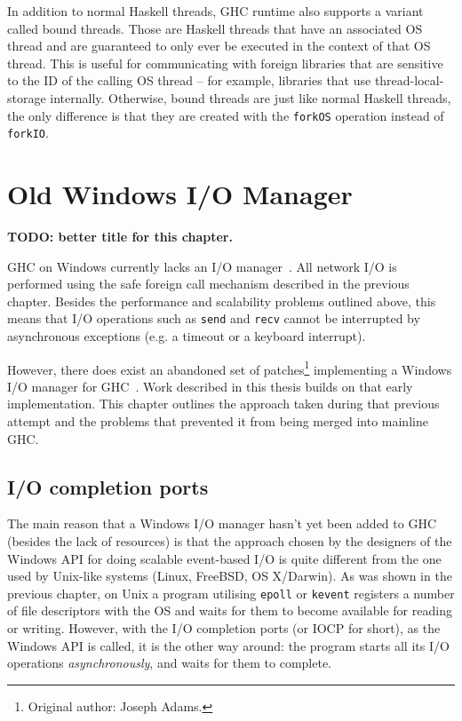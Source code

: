 \documentclass[a4paper,11pt,oneside]{report}
\begin{document}
In addition to normal Haskell threads, GHC runtime also supports a variant
called bound threads. Those are Haskell threads that have an associated OS
thread and are guaranteed to only ever be executed in the context of that OS
thread. This is useful for communicating with foreign libraries that are
sensitive to the ID of the calling OS thread -- for example, libraries that use
thread-local-storage internally. Otherwise, bound threads are just like normal
Haskell threads, the only difference is that they are created with the
\texttt{forkOS} operation instead of \texttt{forkIO}.

\chapter{Old Windows I/O Manager}
\label{chap:old-io-manager}

\textbf{TODO: better title for this chapter.}

GHC on Windows currently lacks an I/O manager~\cite{bib:ticket7353}. All network
I/O is performed using the safe foreign call mechanism described in the previous
chapter. Besides the performance and scalability problems outlined above, this
means that I/O operations such as \texttt{send} and \texttt{recv} cannot be
interrupted by asynchronous exceptions (e.g. a timeout or a keyboard interrupt).

However, there does exist an abandoned set of patches\footnote{Original author:
  Joseph Adams.} implementing a Windows I/O manager for
GHC~\cite{bib:ticket7353}. Work described in this thesis builds on that early
implementation. This chapter outlines the approach taken during that previous
attempt and the problems that prevented it from being merged into mainline GHC.

\section{I/O completion ports}

The main reason that a Windows I/O manager hasn't yet been added to GHC (besides
the lack of resources) is that the approach chosen by the designers of the
Windows API for doing scalable event-based I/O is quite different from the one
used by Unix-like systems (Linux, FreeBSD, OS X/Darwin). As was shown in the
previous chapter, on Unix a program utilising \texttt{epoll} or \texttt{kevent}
registers a number of file descriptors with the OS and waits for them to become
available for reading or writing. However, with the I/O completion ports (or
IOCP for short), as the Windows API is called, it is the other way around: the
program starts all its I/O operations \textit{asynchronously}, and waits for
them to complete.
\end{document}
